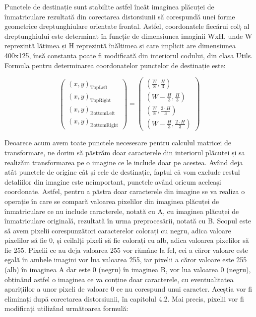 \documentclass[12pt]{article}
\begin{document}
Punctele de destinație sunt stabilite astfel \^{i}nc\^{a}t imaginea pl\u{a}cuței de \^{i}nmatriculare rezultat\u{a} din corectarea distorsiunii s\u{a} corespund\u{a} unei forme geometrice dreptunghiulare orientate frontal. Astfel, coordonatele fiec\u{a}rui colț al dreptunghiului este determinat \^{i}n funcție de dimensiunea imaginii WxH, unde W reprezint\u{a} l\u{a}țimea și H reprezint\u{a} \^{i}n\u{a}lțimea și care implicit are dimensiunea 400x125, \^{i}ns\u{a} constanta poate fi modificat\u{a} din interiorul codului, din clasa Utils. Formula pentru determinarea coordonatelor punctelor de destinație este: 

\begin{equation}
\begin{pmatrix} (x,y)_\mathrm{TopLeft} \\ (x,y)_\mathrm{TopRight} \\ (x,y)_\mathrm{BottomLeft} \\ (x,y)_\mathrm{BottomRight} \end{pmatrix}  = \begin{pmatrix} (\frac{W}{8}, \frac{H}{3}) \\ (W-\frac{H}{3}, \frac{H}{3}) \\ (\frac{W}{8}, \frac{2 \cdot H}{3}) \\ (W-\frac{H}{3}, \frac{2 \cdot H}{3}) \end{pmatrix} 
\end{equation}

Deoarece acum avem toate punctele necesesare pentru calculul matricei de transformare, ne dorim s\u{a} p\u{a}str\u{a}m doar caracterele din interiorul pl\u{a}cuței și sa realiz\u{a}m transformarea pe o imagine ce le include doar pe acestea. Av\^{a}nd deja at\^{a}t punctele de origine c\^{a}t și cele de destinație, faptul c\u{a} vom exclude restul detaliilor din imagine este neimportant, punctele av\^{a}nd oricum aceleași coordonate. Astfel, pentru a p\u{a}stra doar caracterele din imagine se va realiza o operație \^{i}n care se compar\u{a} valoarea pixelilor din imaginea pl\u{a}cuței de \^{i}nmatriculare ce nu include caracterele, notat\u{a} cu A, cu imaginea pl\u{a}cuței de \^{i}nmatriculare original\u{a}, rezultat\u{a} \^{i}n urma preproces\u{a}rii, notat\u{a} cu B. Scopul este s\u{a} avem pixelii corespunz\u{a}tori caracterelor colorați cu negru, adica valoare pixelilor s\u{a} fie 0, și ceilalți pixeli s\u{a} fie colorați cu alb, adica valoarea pixelilor s\u{a} fie 255. Pixelii ce au deja valoarea 255 vor r\u{a}m\^{a}ne la fel, cei a c\u{a}ror valoare este egal\u{a} \^{i}n ambele imagini vor lua valoarea 255, iar pixelii a c\u{a}ror valoare este 255 (alb) \^{i}n imaginea A dar este 0 (negru) \^{i}n imaginea B, vor lua valoarea 0 (negru), obțin\^{a}nd astfel o imaginea ce va conține doar caracterele, cu eventualitatea aparițiilor a unor pixeli de valoare 0 ce nu corespund unui caracter. Aceștia vor fi eliminați dup\u{a} corectarea distorsiunii, \^{i}n capitolul 4.2. Mai precis, pixelii vor fi modificați utiliz\^{a}nd urm\u{a}toarea formul\u{a}:
\end{document}

